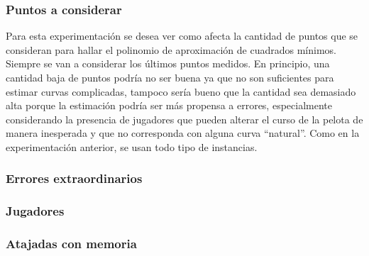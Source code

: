 \subsubsection{Puntos a considerar}
Para esta experimentación se desea ver como afecta la cantidad de puntos que se consideran para hallar el polinomio de aproximación de cuadrados mínimos. Siempre se van a considerar los últimos puntos medidos. En principio, una cantidad baja de puntos podría no ser buena ya que no son suficientes para estimar curvas complicadas, tampoco sería bueno que la cantidad sea demasiado alta porque la estimación podría ser más propensa a errores, especialmente considerando la presencia de jugadores que pueden alterar el curso de la pelota de manera inesperada y que no corresponda con alguna curva ``natural''. Como en la experimentación anterior, se usan todo tipo de instancias.


\subsubsection{Errores extraordinarios}


\subsubsection{Jugadores}

\subsubsection{Atajadas con memoria}
